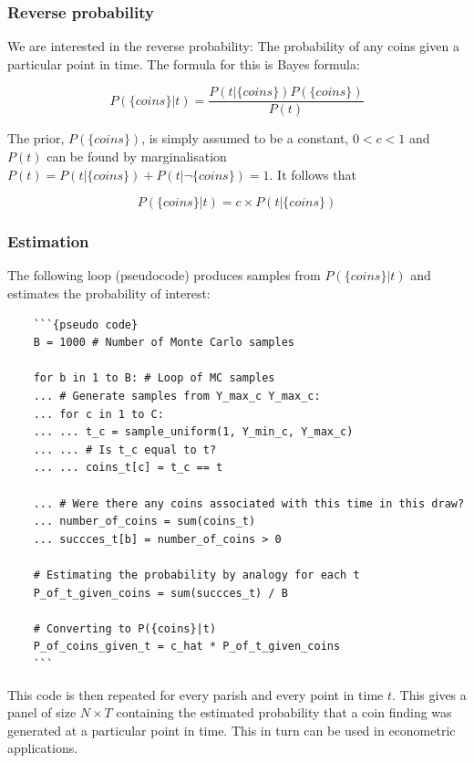 \subsubsection{Reverse probability} 
We are interested in the reverse probability: The probability of any coins given a particular point in time. The formula for this is Bayes formula:

\begin{equation}
P(\{coins\}|t) = \frac{P(t|\{coins\})P(\{coins\})}{P(t)}
\end{equation}

The prior, $P(\{coins\})$, is simply assumed to be a constant, $0<c<1$ and $P(t)$ can be found by marginalisation  $P(t)=P(t|\{coins\})+P(t|\neg\{coins\})=1$. It follows that

\begin{equation}
P(\{coins\}|t) = c\times P(t|\{coins\})
\end{equation}

\subsubsection{Estimation}
The following loop (pseudocode) produces samples from $P(\{coins\}|t)$ and estimates the probability of interest:

\begin{verbatim}
    ```{pseudo code}
    B = 1000 # Number of Monte Carlo samples
    
    for b in 1 to B: # Loop of MC samples
    ...	# Generate samples from Y_max_c Y_max_c:
    ...	for c in 1 to C:
    ...	...	t_c = sample_uniform(1, Y_min_c, Y_max_c)
    ...	...	# Is t_c equal to t?
    ...	...	coins_t[c] = t_c == t
    		
    ...	# Were there any coins associated with this time in this draw?
    ...	number_of_coins = sum(coins_t)
    ...	succces_t[b] = number_of_coins > 0
    	
    # Estimating the probability by analogy for each t
    P_of_t_given_coins = sum(succces_t) / B
    
    # Converting to P({coins}|t)
    P_of_coins_given_t = c_hat * P_of_t_given_coins
    ```
\end{verbatim}



This code is then repeated for every parish and every point in time $t$. This gives a panel of size $N\times T$ containing the estimated probability that a coin finding was generated at a particular point in time. This in turn can be used in econometric applications. 

